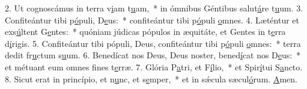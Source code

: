 2. Ut cognoscámus in terra v\uline{i}am t\uline{u}am,~* in ómnibus Géntibus salut\uline{á}re t\uline{u}um.
3. Confiteántur tibi p\uline{ó}puli, D\uline{e}us:~* confiteántur tibi p\uline{ó}puli \uline{o}mnes.
4. Læténtur et exs\uline{ú}ltent G\uline{e}ntes:~* quóniam júdicas pópulos in æquitáte, et Gentes in t\uline{e}rra d\uline{í}rigis.
5. Confiteántur tibi pópuli, Deus, confiteántur tibi p\uline{ó}puli \uline{o}mnes:~* terra dedit fr\uline{u}ctum s\uline{u}um.
6. Benedícat nos Deus, Deus noster, bened\uline{í}cat nos D\uline{e}us:~* et métuant eum omnes f\uline{i}nes t\uline{e}rræ.
7. Glória P\uline{a}tri, et F\uline{í}lio,~* et Spir\uline{í}tui S\uline{a}ncto.
8. Sicut erat in princípio, et n\uline{u}nc, et s\uline{e}mper,~* et in sǽcula sæcul\uline{ó}rum. \uline{A}men.
